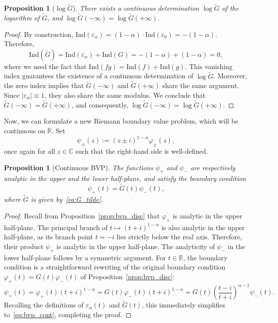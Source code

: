 \documentclass{article}
\theoremstyle{plain}
\newtheorem{proposition}[theorem]{Proposition}
\theoremstyle{definition}
\theoremstyle{remark}
\begin{document}
\begin{proposition}[$\log\widetilde{G}$]\label{prop:logGtilde} There exists a continuous determination $\log \widetilde{G}$ of the logarithm of $\widetilde{G}$, and $\log \widetilde{G}(-\infty)=\log\widetilde{G}(+\infty)$.
\end{proposition}
\begin{proof}
    By construction, $\mathrm{Ind}(\varepsilon_\alpha) = (1-\alpha)\cdot\mathrm{Ind}(\varepsilon_{0}) = -(1-\alpha)$. Therefore,
    $$\mathrm{Ind}(\widetilde{G}) = \mathrm{Ind}(\varepsilon_\alpha) + \mathrm{Ind}(G) = -(1-\alpha) + (1-\alpha) = 0,$$
    where we used the fact that $\mathrm{Ind}(fg) = \mathrm{Ind}(f) + \mathrm{Ind}(g)$. This vanishing index guarantees the existence of a continuous determination of $\log \widetilde{G}$. Moreover, the zero index implies that $\widetilde{G}(-\infty)$ and $\widetilde{G}(+\infty)$ share the same argument. Since $|\varepsilon_\alpha| \equiv 1$, they also share the same modulus. We conclude that $\widetilde{G}(-\infty) = \widetilde{G}(+\infty)$, and consequently, $\log \widetilde{G}(-\infty) = \log \widetilde{G}(+\infty)$.
\end{proof}





Now, we can formulate a new Riemann boundary value problem, which will be continuous on $\overline{\mathbb R}$. Set 
$$\psi_\pm(z):=(z\pm i)^{1-\alpha}\varphi_\pm(z),$$
once again for all $z\in\mathbb C$ such that the right-hand side is well-defined.

\begin{proposition}[Continuous BVP]\label{prop:bvp_cont} The functions $\psi_+$ and $\psi_-$ are respectively analytic in the upper and the lower half-plane, and satisfy the boundary condition
\begin{equation}\label{eq:bvp_cont}
    \psi_+(t)=\widetilde{G}(t)\psi_-(t),
\end{equation}
where $\widetilde{G}$ is given by~\eqref{eq:G_tilde}.
\end{proposition}

\begin{proof}
    Recall from Proposition~\ref{prop:bvp_disc} that $\varphi_+$ is analytic in the upper half-plane. The principal branch of $t \mapsto (t+i)^{1-\alpha}$ is also analytic in the upper half-plane, as its branch point $t=-i$ lies strictly below the real axis. Therefore, their product $\psi_+$ is analytic in the upper half-plane. The analyticity of $\psi_-$ in the lower half-plane follows by a symmetric argument. For $t\in\mathbb R$, the boundary condition is a straightforward rewriting of the original boundary condition $\varphi_+(t)=G(t)\varphi_-(t)$ of Proposition~\ref{prop:bvp_disc}:
    \begin{equation*}
        \psi_+(t) = \varphi_+(t)(t+i)^{1-\alpha} = G(t)\varphi_-(t)(t+i)^{1-\alpha} = G(t)\left(\frac{t-i}{t+i}\right)^{\alpha-1}\psi_-(t).
    \end{equation*}
    Recalling the definitions of $\varepsilon_\alpha(t)$ and $\widetilde{G}(t)$, this immediately simplifies to~\eqref{eq:bvp_cont}, completing the proof.
\end{proof}
\end{document}
